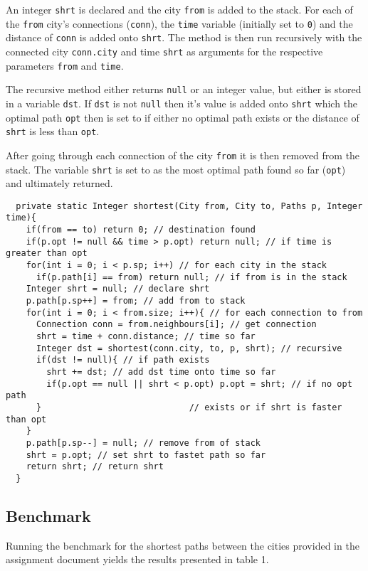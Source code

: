 \documentclass[a4paper,11pt]{article}
\begin{document}
An integer {\tt shrt} is declared and the city {\tt from} is added to the
stack. For each of the {\tt from} city's connections ({\tt conn}), the 
{\tt time} variable (initially set to {\tt 0}) and the distance of 
{\tt conn} is added onto {\tt shrt}. The method is then run recursively
with the connected city {\tt conn.city} and time {\tt shrt} as arguments 
for the respective parameters {\tt from} and {\tt time}. 

The recursive method either returns {\tt null} or an integer value, but 
either is stored in a variable {\tt dst}. If {\tt dst} is not {\tt null} 
then it's value is added onto {\tt shrt} which the optimal path {\tt opt}
then is set to if either no optimal path exists or the distance of 
{\tt shrt} is less than {\tt opt}.

After going through each connection of the city {\tt from} it is then 
removed from the stack. The variable {\tt shrt} is set to as the most
optimal path found so far ({\tt opt}) and ultimately returned.

\begin{verbatim}
  private static Integer shortest(City from, City to, Paths p, Integer time){
    if(from == to) return 0; // destination found
    if(p.opt != null && time > p.opt) return null; // if time is greater than opt
    for(int i = 0; i < p.sp; i++) // for each city in the stack
      if(p.path[i] == from) return null; // if from is in the stack
    Integer shrt = null; // declare shrt
    p.path[p.sp++] = from; // add from to stack
    for(int i = 0; i < from.size; i++){ // for each connection to from
      Connection conn = from.neighbours[i]; // get connection
      shrt = time + conn.distance; // time so far
      Integer dst = shortest(conn.city, to, p, shrt); // recursive
      if(dst != null){ // if path exists
        shrt += dst; // add dst time onto time so far
        if(p.opt == null || shrt < p.opt) p.opt = shrt; // if no opt path
      }                             // exists or if shrt is faster than opt
    }
    p.path[p.sp--] = null; // remove from of stack
    shrt = p.opt; // set shrt to fastet path so far
    return shrt; // return shrt
  }
\end{verbatim}

\subsection*{Benchmark}

Running the benchmark for the shortest paths between the cities provided
in the assignment document yields the results presented in table 1.
\end{document}
